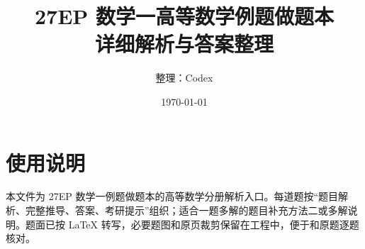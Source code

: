 \documentclass[UTF8,12pt,a4paper]{ctexbook}
\title{27EP 数学一高等数学例题做题本\\详细解析与答案整理}
\author{整理：Codex}
\date{\today}
\begin{document}
\maketitle
\tableofcontents

\chapter*{使用说明}
本文件为 27EP 数学一例题做题本的高等数学分册解析入口。每道题按“题目解析、完整推导、答案、考研提示”组织；适合一题多解的题目补充方法二或多解说明。题面已按 LaTeX 转写，必要题图和原页裁剪保留在工程中，便于和原题逐题核对。


















\end{document}
